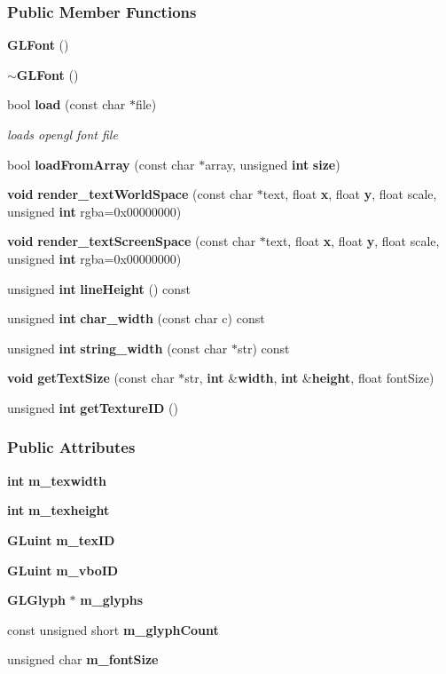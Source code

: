 \subsubsection*{Public Member Functions}
\begin{DoxyCompactItemize}
\item 
{\bf G\+L\+Font} ()
\item 
{\bf $\sim$\+G\+L\+Font} ()
\item 
bool {\bf load} (const char $\ast$file)
\begin{DoxyCompactList}\small\item\em loads opengl font file \end{DoxyCompactList}\item 
bool {\bf load\+From\+Array} (const char $\ast$array, unsigned {\bf int} {\bf size})
\item 
{\bf void} {\bf render\+\_\+text\+World\+Space} (const char $\ast$text, float {\bf x}, float {\bf y}, float scale, unsigned {\bf int} rgba=0x00000000)
\item 
{\bf void} {\bf render\+\_\+text\+Screen\+Space} (const char $\ast$text, float {\bf x}, float {\bf y}, float scale, unsigned {\bf int} rgba=0x00000000)
\item 
unsigned {\bf int} {\bf line\+Height} () const 
\item 
unsigned {\bf int} {\bf char\+\_\+width} (const char c) const 
\item 
unsigned {\bf int} {\bf string\+\_\+width} (const char $\ast$str) const 
\item 
{\bf void} {\bf get\+Text\+Size} (const char $\ast$str, {\bf int} \&{\bf width}, {\bf int} \&{\bf height}, float font\+Size)
\item 
unsigned {\bf int} {\bf get\+Texture\+ID} ()
\end{DoxyCompactItemize}
\subsubsection*{Public Attributes}
\begin{DoxyCompactItemize}
\item 
{\bf int} {\bf m\+\_\+texwidth}
\item 
{\bf int} {\bf m\+\_\+texheight}
\item 
{\bf G\+Luint} {\bf m\+\_\+tex\+ID}
\item 
{\bf G\+Luint} {\bf m\+\_\+vbo\+ID}
\item 
{\bf G\+L\+Glyph} $\ast$ {\bf m\+\_\+glyphs}
\item 
const unsigned short {\bf m\+\_\+glyph\+Count}
\item 
unsigned char {\bf m\+\_\+font\+Size}
\end{DoxyCompactItemize}


